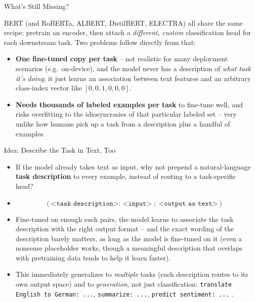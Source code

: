 \begin{vbframe}{What's Still Missing?}

\vfill

BERT (and RoBERTa, ALBERT, DistilBERT, ELECTRA) all share the same recipe: pretrain an encoder, then attach a \emph{different, custom} classification head for each downstream task. Two problems follow directly from that:

\begin{itemize}
	\item \textbf{One fine-tuned copy per task} -- not realistic for many deployment scenarios (e.g.\ on-device), and the model never has a description of \emph{what task it's doing}; it just learns an association between text features and an arbitrary class-index vector like $[0,0,1,0,0,0]$.
	\item \textbf{Needs thousands of labeled examples per task} to fine-tune well, and risks overfitting to the idiosyncrasies of that particular labeled set -- very unlike how humans pick up a task from a description plus a handful of examples.
\end{itemize}

\vfill

\end{vbframe}

\begin{vbframe}{Idea: Describe the Task in Text, Too}

\vfill

\begin{itemize}
	\item If the model already takes text as input, why not prepend a natural-language \textbf{task description} to every example, instead of routing to a task-specific head?
	\item $$(\texttt{<task description>: <input>} \;;\; \texttt{<output as text>})$$
	\item Fine-tuned on enough such pairs, the model learns to associate the task description with the right output format -- and the exact wording of the description barely matters, as long as the model is fine-tuned on it (even a nonsense placeholder works, though a meaningful description that overlaps with pretraining data tends to help it learn faster).
	\item This immediately generalizes to \emph{multiple} tasks (each description routes to its own output space) and to \emph{generation}, not just classification: \texttt{translate English to German: ...}, \texttt{summarize: ...}, \texttt{predict sentiment: ...} .
\end{itemize}

\vfill

\end{vbframe}


